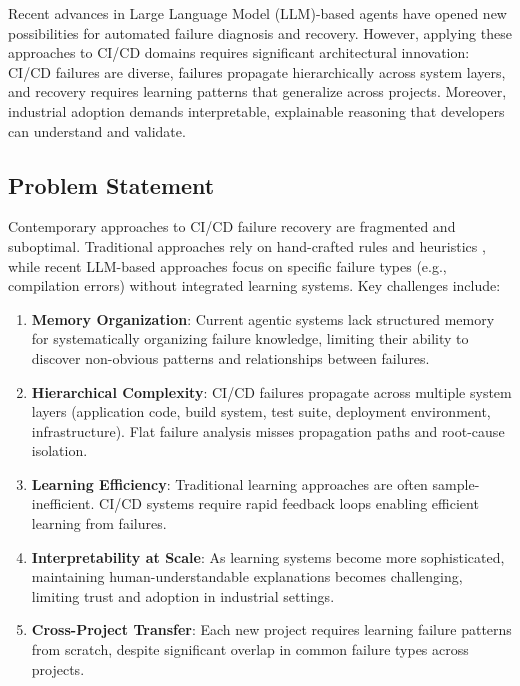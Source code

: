 \documentclass[11pt]{article}
\begin{document}
Recent advances in Large Language Model (LLM)-based agents have opened new possibilities for automated failure diagnosis and recovery. However, applying these approaches to CI/CD domains requires significant architectural innovation: CI/CD failures are diverse, failures propagate hierarchically across system layers, and recovery requires learning patterns that generalize across projects. Moreover, industrial adoption demands interpretable, explainable reasoning that developers can understand and validate.

\subsection{Problem Statement}

Contemporary approaches to CI/CD failure recovery are fragmented and suboptimal. Traditional approaches rely on hand-crafted rules and heuristics \citep{Fu2025}, while recent LLM-based approaches focus on specific failure types (e.g., compilation errors) without integrated learning systems. Key challenges include:

\begin{enumerate}
    \item \textbf{Memory Organization}: Current agentic systems lack structured memory for systematically organizing failure knowledge, limiting their ability to discover non-obvious patterns and relationships between failures.

    \item \textbf{Hierarchical Complexity}: CI/CD failures propagate across multiple system layers (application code, build system, test suite, deployment environment, infrastructure). Flat failure analysis misses propagation paths and root-cause isolation.

    \item \textbf{Learning Efficiency}: Traditional learning approaches are often sample-inefficient. CI/CD systems require rapid feedback loops enabling efficient learning from failures.

    \item \textbf{Interpretability at Scale}: As learning systems become more sophisticated, maintaining human-understandable explanations becomes challenging, limiting trust and adoption in industrial settings.

    \item \textbf{Cross-Project Transfer}: Each new project requires learning failure patterns from scratch, despite significant overlap in common failure types across projects.
\end{enumerate}
\end{document}
